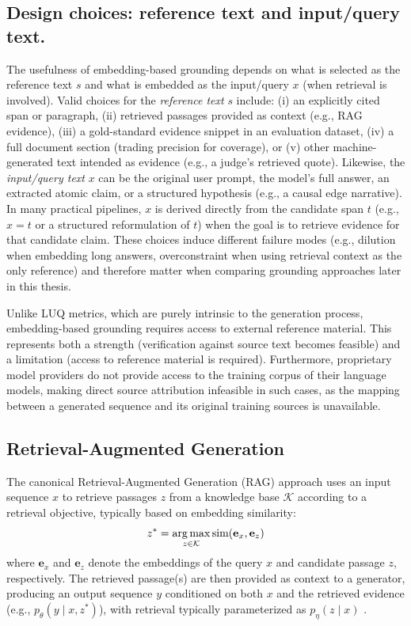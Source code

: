 \subsection{Design choices: reference text and input/query text.} The usefulness of embedding-based grounding depends on what is selected as the reference text $s$ and what is embedded as the input/query $x$ (when retrieval is involved). Valid choices for the \emph{reference text} $s$ include: (i) an explicitly cited span or paragraph, (ii) retrieved passages provided as context (e.g., RAG evidence), (iii) a gold-standard evidence snippet in an evaluation dataset, (iv) a full document section (trading precision for coverage), or (v) other machine-generated text intended as evidence (e.g., a judge's retrieved quote). Likewise, the \emph{input/query text} $x$ can be the original user prompt, the model's full answer, an extracted atomic claim, or a structured hypothesis (e.g., a causal edge narrative). In many practical pipelines, $x$ is derived directly from the candidate span $t$ (e.g., $x=t$ or a structured reformulation of $t$) when the goal is to retrieve evidence for that candidate claim. These choices induce different failure modes (e.g., dilution when embedding long answers, overconstraint when using retrieval context as the only reference) and therefore matter when comparing grounding approaches later in this thesis.

Unlike LUQ metrics, which are purely intrinsic to the generation process, embedding-based grounding requires access to external reference material. This represents both a strength (verification against source text becomes feasible) and a limitation (access to reference material is required). Furthermore, proprietary model providers do not provide access to the training corpus of their language models, making direct source attribution infeasible in such cases, as the mapping between a generated sequence and its original training sources is unavailable.

\subsection{Retrieval-Augmented Generation}

The canonical Retrieval-Augmented Generation (RAG) approach \citep{lewis2021retrievalaugmentedgenerationknowledgeintensivenlp} uses an input sequence $x$ to retrieve passages $z$ from a knowledge base $\mathcal{K}$ according to a retrieval objective, typically based on embedding similarity:
\begin{equation}
z^* = \operatorname*{arg\,max}_{z \in \mathcal{K}} \text{sim}(\mathbf{e}_x, \mathbf{e}_z)
\end{equation}
where $\mathbf{e}_x$ and $\mathbf{e}_z$ denote the embeddings of the query $x$ and candidate passage $z$, respectively. The retrieved passage(s) are then provided as context to a generator, producing an output sequence $y$ conditioned on both $x$ and the retrieved evidence (e.g., $p_\theta(y \mid x, z^*)$), with retrieval typically parameterized as $p_\eta(z \mid x)$ \citep{lewis2021retrievalaugmentedgenerationknowledgeintensivenlp}.

